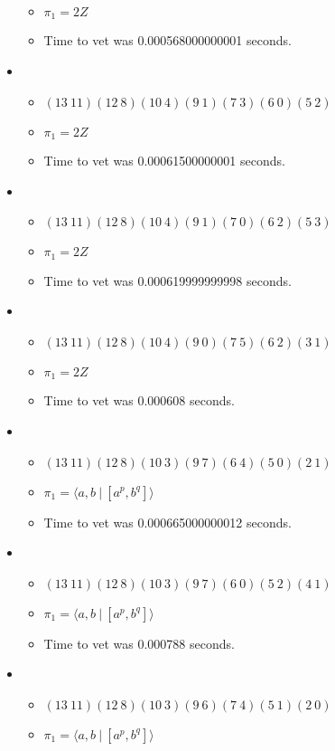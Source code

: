 \documentclass{article}
\begin{document}
\begin{itemize}
\begin{itemize}
      \item $\pi_1 =2 Z$
      \item Time to vet was 0.000568000000001 seconds.
\end{itemize}
\item \begin{itemize}
      \item $(13\ 11)(12\ 8)(10\ 4)(9\ 1)(7\ 3)(6\ 0)(5\ 2)$
      \item $\pi_1 =2 Z$
      \item Time to vet was 0.00061500000001 seconds.
\end{itemize}
\item \begin{itemize}
      \item $(13\ 11)(12\ 8)(10\ 4)(9\ 1)(7\ 0)(6\ 2)(5\ 3)$
      \item $\pi_1 =2 Z$
      \item Time to vet was 0.000619999999998 seconds.
\end{itemize}
\item \begin{itemize}
      \item $(13\ 11)(12\ 8)(10\ 4)(9\ 0)(7\ 5)(6\ 2)(3\ 1)$
      \item $\pi_1 =2 Z$
      \item Time to vet was 0.000608 seconds.
\end{itemize}
\item \begin{itemize}
      \item $(13\ 11)(12\ 8)(10\ 3)(9\ 7)(6\ 4)(5\ 0)(2\ 1)$
      \item $\pi_1 = \langle a,b\ |\ [a^p,b^q]\rangle$
      \item Time to vet was 0.000665000000012 seconds.
\end{itemize}
\item \begin{itemize}
      \item $(13\ 11)(12\ 8)(10\ 3)(9\ 7)(6\ 0)(5\ 2)(4\ 1)$
      \item $\pi_1 = \langle a,b\ |\ [a^p,b^q]\rangle$
      \item Time to vet was 0.000788 seconds.
\end{itemize}
\item \begin{itemize}
      \item $(13\ 11)(12\ 8)(10\ 3)(9\ 6)(7\ 4)(5\ 1)(2\ 0)$
      \item $\pi_1 = \langle a,b\ |\ [a^p,b^q]\rangle$

\end{itemize}
\end{itemize}
\end{document}
